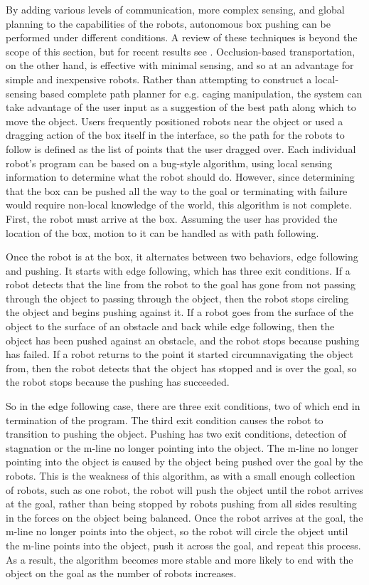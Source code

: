 By adding various levels of communication, more complex sensing, and global planning to the capabilities of the robots, autonomous box pushing can be performed under different conditions. 
A review of these techniques is beyond the scope of this section, but for recent results see \citep{tuci2018cooperative, rahimi2018comparison, alkilabi2017cooperative}. 
Occlusion-based transportation, on the other hand, is effective with minimal sensing, and so at an advantage for simple and inexpensive robots.
Rather than attempting to construct a local-sensing based complete path planner for e.g. caging manipulation, the system can take advantage of the user input as a suggestion of the best path along which to move the object. 
Users frequently positioned robots near the object or used a dragging action of the box itself in the interface, so the path for the robots to follow is defined as the list of points that the user dragged over. 
Each individual robot's program can be based on a bug-style algorithm, using local sensing information to determine what the robot should do. 
However, since determining that the box can be pushed all the way to the goal or terminating with failure  would require non-local knowledge of the world, this algorithm is not complete.
First, the robot must arrive at the box.
Assuming the user has provided the location of the box, motion to it can be handled as with path following. 

Once the robot is at the box, it alternates between two behaviors, edge following and pushing. 
It starts with edge following, which has three exit conditions. 
If a robot detects that the line from the robot to the goal has gone from not passing through the object to passing through the object, then the robot stops circling the object and begins pushing against it. 
If a robot goes from the surface of the object to the surface of an obstacle and back while edge following, then the object has been pushed against an obstacle, and the robot stops because pushing has failed. 
If a robot returns to the point it started circumnavigating the object from, then the robot detects that the object has stopped and is over the goal, so the robot stops because the pushing has succeeded. 

So in the edge following case, there are three exit conditions, two of which end in termination of the program. 
The third exit condition causes the robot to transition to pushing the object. 
Pushing has two exit conditions, detection of stagnation or the m-line no longer pointing into the object. 
The m-line no longer pointing into the object is caused by the object being pushed over the goal by the robots. 
This is the weakness of this algorithm, as with a small enough collection of robots, such as one robot, the robot will push the object until the robot arrives at the goal, rather than being stopped by robots pushing from all sides resulting in the forces on the object being balanced. 
Once the robot arrives at the goal, the m-line no longer points into the object, so the robot will circle the object until the m-line points into the object, push it across the goal, and repeat this process. 
As a result, the algorithm becomes more stable and more likely to end with the object on the goal as the number of robots increases. 

